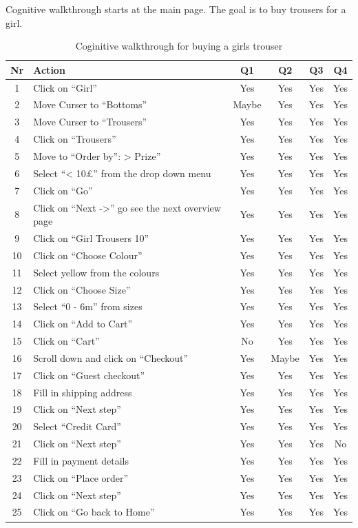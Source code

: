 Cognitive walkthrough starts at the main page. The goal is to buy trousers for a girl.  
\begin{table}[htdp]
\begin{center}
\begin{tabular}{|c|l|c|c|c|c|}
\hline
\textbf{Nr} & \textbf{Action} & \textbf{Q1} & \textbf{Q2} & \textbf{Q3} &\textbf{Q4} \\
\hline
1 & Click on ``Girl''& Yes & Yes & Yes & Yes\\
\hline
2 & Move Curser to ``Bottoms'' & Maybe & Yes & Yes & Yes \\
\hline
3 & Move Curser to ``Trousers'' & Yes & Yes & Yes & Yes \\
\hline
4 & Click on ``Trousers'' & Yes & Yes & Yes & Yes \\
\hline
5 & Move to ``Order by'': > Prize'' & Yes & Yes & Yes & Yes \\
\hline
6 & Select ``< 10\pounds'' from the drop down menu & Yes & Yes & Yes & Yes\\
\hline
7 & Click on ``Go'' & Yes & Yes & Yes & Yes\\
\hline
8 & Click on ``Next ->'' go see the next overview page & Yes & Yes & Yes & Yes\\
\hline
9 & Click on ``Girl Trousers 10'' & Yes & Yes & Yes & Yes\\
\hline
10 & Click on ``Choose Colour'' & Yes & Yes & Yes & Yes\\
\hline
11 & Select yellow from the colours & Yes & Yes & Yes & Yes\\
\hline
12 & Click on ``Choose Size'' & Yes & Yes & Yes & Yes\\
\hline
13 & Select ``0 - 6m'' from sizes & Yes & Yes & Yes & Yes\\
\hline
14 & Click on ``Add to Cart'' & Yes & Yes & Yes & Yes\\
\hline
15 & Click on ``Cart'' & No & Yes & Yes & Yes\\
\hline
16 & Scroll down and click on ``Checkout'' & Yes & Maybe & Yes & Yes\\
\hline
17 & Click on ``Guest checkout'' & Yes & Yes & Yes & Yes\\
\hline
18 & Fill in shipping address & Yes & Yes & Yes & Yes\\
\hline
19 & Click on ``Next step'' & Yes & Yes & Yes & Yes\\
\hline
20 & Select ``Credit Card'' & Yes & Yes & Yes & Yes\\
\hline
21 & Click on ``Next step'' & Yes & Yes & Yes & No\\
\hline
22 & Fill in payment details & Yes & Yes & Yes & Yes\\
\hline
23 & Click on ``Place order'' & Yes & Yes & Yes & Yes\\
\hline
24 & Click on ``Next step'' & Yes & Yes & Yes & Yes\\
\hline
25 & Click on ``Go back to Home'' & Yes & Yes & Yes & Yes\\
\hline
\end{tabular}
\end{center}
\label{cog_walkthrough_girl_trouser}
\caption{Coginitive walkthrough for buying a girls trouser}
\end{table}%

